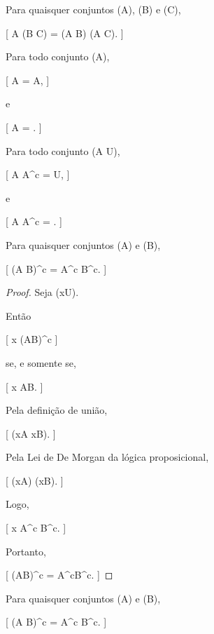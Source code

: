 \documentclass[../../main]{subfiles}
\begin{document}
\begin{prop}

	Para quaisquer conjuntos (A), (B) e (C),

	[
			A \cap (B \cup C)
			=
			(A \cap B)
			\cup
			(A \cap C).
		]

\end{prop}

\begin{prop}

	Para todo conjunto (A),

	[
			A \cup \varnothing = A,
		]

	e

		[
			A \cap \varnothing = \varnothing.
		]

\end{prop}

\begin{prop}

	Para todo conjunto (A \subseteq U),

	[
			A \cup A^{c}
			=
			U,
		]

	e

		[
			A \cap A^{c}
			=
			\varnothing.
		]

\end{prop}

\begin{prop}

	Para quaisquer conjuntos (A) e (B),

	[
			(A \cup B)^c
			=
			A^c \cap B^c.
		]

\end{prop}

\begin{proof}

	Seja (x\in U).

	Então

	[
	x \in (A\cup B)^c
	]

	se, e somente se,

	[
			x \notin A\cup B.
		]

	Pela definição de união,

	[
			\neg(x\in A \lor x\in B).
		]

	Pela Lei de De Morgan da lógica proposicional,

	[
			(x\notin A)
			\land
			(x\notin B).
		]

	Logo,

	[
			x \in A^c \cap B^c.
		]

	Portanto,

	[
			(A\cup B)^c
			=
			A^c\cap B^c.
		]

\end{proof}

\begin{prop}

	Para quaisquer conjuntos (A) e (B),

	[
			(A \cap B)^c
			=
			A^c \cup B^c.
		]

\end{prop}
\end{document}
